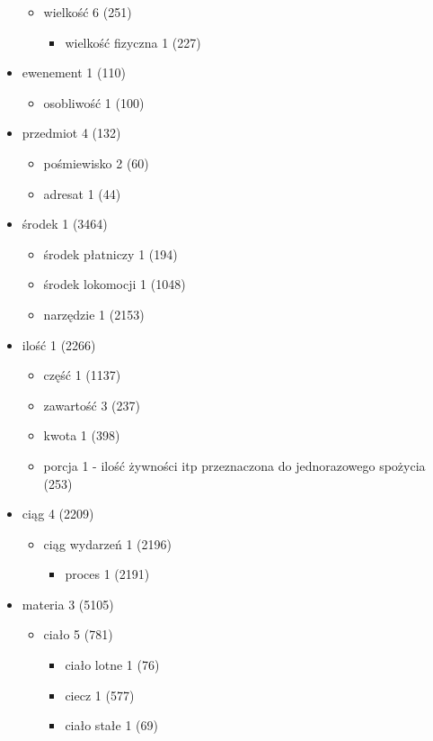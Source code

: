 \documentclass[a4paper,12pt]{article}
\begin{document}
\begin{itemize}
\begin{itemize}
  \item wielkość 6  (251)
    \begin{itemize}
    \item wielkość fizyczna 1  (227)
    \end{itemize}
  \end{itemize}
\item ewenement 1  (110)
  \begin{itemize}
  \item osobliwość 1  (100)
  \end{itemize}
\item przedmiot 4  (132)
  \begin{itemize}
  \item  pośmiewisko 2 (60)
  \item  adresat 1 (44)
  \end{itemize}
\item środek 1  (3464)
  \begin{itemize}
  \item środek płatniczy 1  (194)
  \item środek lokomocji 1  (1048)
  \item narzędzie 1  (2153)
  \end{itemize}
\item ilość 1  (2266)
  \begin{itemize}
  \item część 1  (1137)
  \item zawartość 3 (237) %
  \item kwota 1  (398)
  \item porcja 1 - ilość żywności itp przeznaczona do jednorazowego spożycia (253)
  \end{itemize}
\item ciąg 4  (2209)
  \begin{itemize}
  \item  ciąg wydarzeń 1  (2196)
    \begin{itemize}
    \item  proces 1 (2191)
    \end{itemize}
  \end{itemize}
\item materia 3  (5105)
  \begin{itemize}
  \item ciało 5  (781)
    \begin{itemize}
    \item ciało lotne 1  (76)
    \item ciecz 1  (577)
    \item ciało stałe 1  (69)

\end{itemize}
\end{itemize}
\end{itemize}
\end{document}
